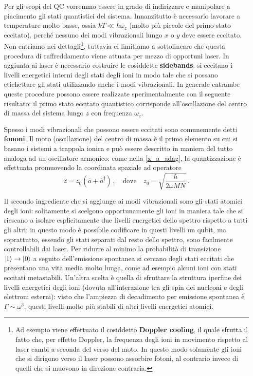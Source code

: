 \noindent Per gli scopi del QC vorremmo essere in grado di indirizzare e manipolare a piacimento gli stati quantistici del sistema. Innanzitutto è necessario lavorare a temperature molto basse, ossia $k T \ll \hbar \omega_z$ (molto più piccole del primo stato eccitato), perché nessuno dei modi vibrazionali lungo $x$ o $y$ deve essere eccitato. Non entriamo nei dettagli\footnote{Ad esempio viene effettuato il cosiddetto \textbf{Doppler cooling}, il quale sfrutta il fatto che, per effetto Doppler, la frequenza degli ioni in movimento rispetto al laser cambi a seconda del verso del moto. In questo modo solamente gli ioni che si dirigono verso il laser possono assorbire fotoni, al contrario invece di quelli che si muovono in direzione contraria.}, tuttavia ci limitiamo a sottolineare che questa procedura di raffreddamento viene attuata per mezzo di opportuni laser. In aggiunta ai laser è necessario costruire le cosiddette \textbf{sidebands}: si eccitano i livelli energetici interni degli stati degli ioni in modo tale che si possano etichettare gli stati utilizzando anche i modi vibrazionali. In generale entrambe queste procedure possono essere realizzate sperimentalmente con il seguente risultato: il primo stato eccitato quantistico corrisponde all'oscillazione del centro di massa del sistema lungo $z$ con frequenza $\omega_z$. 

\noindent Spesso i modi vibrazionali che possono essere eccitati sono comunemente detti \textbf{fononi}. Il moto (oscillazione) del centro di massa è il primo elemento su cui si basano i sistemi a trappola ionica e può essere descritto in maniera del tutto analoga ad un oscillatore armonico: come nella \eqref{x_a_adag}, la quantizzazione è effettuata promuovendo la coordinata spaziale ad operatore
\begin{equation*}
    \hat{z} = z_0 (\hat{a} + \hat{a}^\dag) \, , \quad \text{dove} \quad z_0 = \sqrt{\frac{\hbar}{2 \omega M N}} \, .
\end{equation*}

\noindent Il secondo ingrediente che si aggiunge ai modi vibrazionali sono gli stati atomici degli ioni: solitamente si scelgono opportunamente gli ioni in maniera tale che si riescano a isolare esplicitamente due livelli energetici dello spettro rispetto a tutti gli altri; in questo modo è possibile codificare in questi livelli un qubit, ma soprattutto, essendo gli stati separati dal resto dello spettro, sono facilmente controllabili dai laser.  Per ridurre al minimo la probabilità di transizione $\ket{1} \to \ket{0} $ a seguito dell'emissione spontanea si cercano degli stati eccitati che presentano una vita media molto lunga, come ad esempio alcuni ioni con stati eccitati metastabili. Un'altra scelta è quella di sfruttare la struttura iperfine dei livelli energetici degli ioni (dovuta all'interazione tra gli spin dei nucleoni e degli elettroni esterni): visto che l'ampiezza di decadimento per emissione spontanea \`e $\Gamma \sim \omega^3$, questi livelli molto più stabili di altri livelli energetici atomici.  


